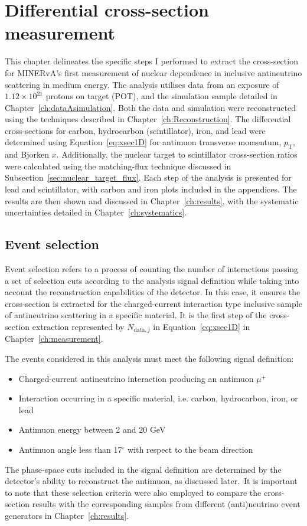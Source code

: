 \chapter{Differential cross-section measurement}

\label{ch:analysis1D}
\vspace{-12pt}
This chapter delineates the specific steps I performed to extract the cross-section for MINERvA's first measurement of nuclear dependence in inclusive antineutrino scattering in medium energy. The analysis utilises data from an exposure of $1.12 \times 10^{21}$ protons on target (POT), and the simulation sample detailed in Chapter~\ref{ch:dataAsimulation}. Both the data and simulation were reconstructed using the techniques described in Chapter~\ref{ch:Reconstruction}. The differential cross-sections for carbon, hydrocarbon (scintillator), iron, and lead were determined using Equation~\ref{eq:xsec1D} for antimuon transverse momentum, $p_{\text{T}}$, and Bjorken $x$. Additionally, the nuclear target to scintillator cross-section ratios were calculated using the matching-flux technique discussed in Subsection~\ref{sec:nuclear_target_flux}. Each step of the analysis is presented for lead and scintillator, with carbon and iron plots included in the appendices. The results are then shown and discussed in Chapter~\ref{ch:results}, with the systematic uncertainties detailed in Chapter~\ref{ch:systematics}.

\section{Event selection}
\label{sec:eventSelection}
Event selection refers to a process of counting the number of interactions passing a set of selection cuts according to the analysis signal definition while taking into account the reconstruction capabilities of the detector. In this case, it ensures the cross-section is extracted for the charged-current interaction type inclusive sample of antineutrino scattering in a specific material. It is the first step of the cross-section extraction represented by $N_{\text{data}, j}$ in Equation~\ref{eq:xsec1D} in Chapter~\ref{ch:measurement}.

The events considered in this analysis must meet the following signal definition:
\begin{itemize}
    \item Charged-current antineutrino interaction producing an antimuon $\mu^{+}$
    \item Interaction occurring in a specific material, i.e. carbon, hydrocarbon, iron, or lead
    \item Antimuon energy between 2 and 20 GeV
    \item Antimuon angle less than 17$^\circ$ with respect to the beam direction
\end{itemize}
The phase-space cuts included in the signal definition are determined by the detector's ability to reconstruct the antimuon, as discussed later.~It is important to note that these selection criteria were also employed to compare the cross-section results with the corresponding samples from different (anti)neutrino event generators in Chapter~\ref{ch:results}.

